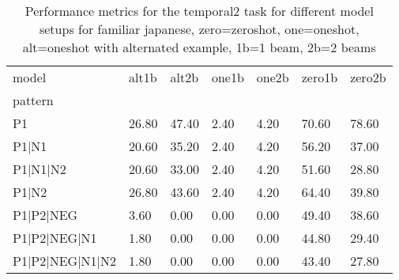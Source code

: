 \begin{table}[h]
\begin{tabular}{l|llllll}
\toprule
model & alt1b & alt2b & one1b & one2b & zero1b & zero2b \\
pattern &  &  &  &  &  &  \\
\midrule
P1 & 26.80 & 47.40 & 2.40 & 4.20 & 70.60 & 78.60 \\
P1|N1 & 20.60 & 35.20 & 2.40 & 4.20 & 56.20 & 37.00 \\
P1|N1|N2 & 20.60 & 33.00 & 2.40 & 4.20 & 51.60 & 28.80 \\
P1|N2 & 26.80 & 43.60 & 2.40 & 4.20 & 64.40 & 39.80 \\
P1|P2|NEG & 3.60 & 0.00 & 0.00 & 0.00 & 49.40 & 38.60 \\
P1|P2|NEG|N1 & 1.80 & 0.00 & 0.00 & 0.00 & 44.80 & 29.40 \\
P1|P2|NEG|N1|N2 & 1.80 & 0.00 & 0.00 & 0.00 & 43.40 & 27.80 \\
\bottomrule
\end{tabular}
\caption{Performance metrics for the temporal2 task for different model setups for familiar japanese, zero=zeroshot, one=oneshot, alt=oneshot with alternated example, 1b=1 beam, 2b=2 beams}
\label{tab:ja fam_temporal2_performance}
\end{table}
